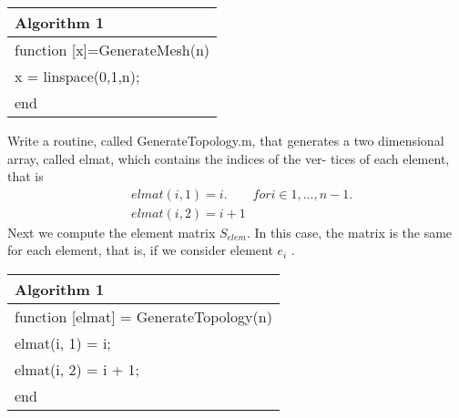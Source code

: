 \documentclass[a4paper,10pt]{report}
\begin{document}
\begin{enumerate}
\begin{table}[!h]\centering

\begin{tabular}{ |l| } 
\hline
\textbf{Algorithm 1}\\
\hline
\hspace{0.5cm}function [x]=GenerateMesh(n)\\
\hspace{1cm}x = linspace(0,1,n);\\
\hspace{0.5cm}end\\
\hline
\end{tabular}

\end{table}

 Write a routine, called GenerateTopology.m, that generates
a two dimensional array, called elmat, which contains the indices of the ver-
tices of each element, that is
\begin{align*}
&elmat(i, 1) = i. \qquad for i ∈ {1, . . . , n − 1}.\\
&elmat(i, 2) = i + 1
\end{align*}
Next we compute the element matrix $S_{elem}$. In this case, the matrix is the
same for each element, that is, if we consider element $e_i$ .
\begin{table}[!h]\centering

\begin{tabular}{ |l| } 
\hline
\textbf{Algorithm 1}\\
\hline
\hspace{0.5cm}function [elmat] = GenerateTopology(n)\\
\hspace{1cm}elmat(i, 1) = i;\\
\hspace{1cm}elmat(i, 2) = i + 1;\\
\hspace{0.5cm}end\\
\hline
\end{tabular}

\end{table}

\end{enumerate}
\end{document}
